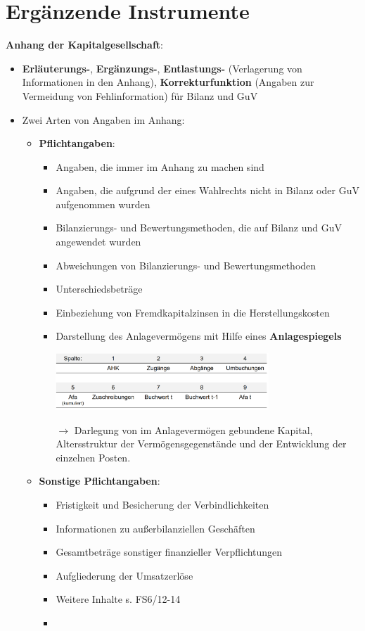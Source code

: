 \section{Ergänzende Instrumente}

\textbf{Anhang der Kapitalgesellschaft}:
\begin{itemize}
	\item \textbf{Erläuterungs-}, \textbf{Ergänzungs-}, \textbf{Entlastungs-} (Verlagerung von Informationen in den Anhang), \textbf{Korrekturfunktion} (Angaben zur Vermeidung von Fehlinformation) für Bilanz und GuV
	\item Zwei Arten von Angaben im Anhang:
	\begin{itemize}
		\item \textbf{Pflichtangaben}:
		\begin{itemize}
			\item Angaben, die immer im Anhang zu machen sind
			\item Angaben, die aufgrund der eines Wahlrechts nicht in Bilanz oder GuV aufgenommen wurden
			\item Bilanzierungs- und Bewertungsmethoden, die auf Bilanz und GuV angewendet wurden
			\item Abweichungen von Bilanzierungs- und Bewertungsmethoden
			\item Unterschiedsbeträge
			\item Einbeziehung von Fremdkapitalzinsen in die Herstellungskosten
			\item Darstellung des Anlagevermögens mit Hilfe eines \textbf{Anlagespiegels}
			\begin{center}
				\includegraphics[width=0.7\textwidth]{images/anmirr.png}
			\end{center}
			$\rightarrow$ Darlegung von im Anlagevermögen gebundene Kapital, Altersstruktur der Vermögensgegenstände und der Entwicklung der einzelnen Posten.
		\end{itemize}
		\item \textbf{Sonstige Pflichtangaben}: 
		\begin{itemize}
			\item Fristigkeit und Besicherung der Verbindlichkeiten
			\item Informationen zu außerbilanziellen Geschäften
			\item Gesamtbeträge sonstiger finanzieller Verpflichtungen
			\item Aufgliederung der Umsatzerlöse
			\item Weitere Inhalte s. FS6/12-14
			\item
		\end{itemize}
	\end{itemize}
\end{itemize}